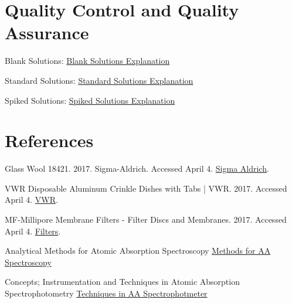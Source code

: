 \documentclass[12pt]{../SOP3_beta}\usepackage[]{graphicx}\usepackage[]{color}
\begin{document}
\section{Quality Control and Quality Assurance}

\NP Blank Solutions: \href{https://en.wikipedia.org/wiki/Blank_(solution)}{Blank Solutions Explanation}

\NP Standard Solutions: \href{https://en.wikipedia.org/wiki/Standard_solution}{Standard Solutions Explanation}

\NP Spiked Solutions: \href{}{Spiked Solutions Explanation}



\section{References}



\NP Glass Wool 18421. 2017. Sigma-Aldrich. Accessed April 4. \href{http://www.sigmaaldrich.com/catalog/product/sial/18421}{Sigma Aldrich}.

\NP VWR Disposable Aluminum Crinkle Dishes with Tabs | VWR. 2017. Accessed April 4. \href{https://us.vwr.com/store/catalog/product.jsp?product_id=4622693}{VWR}.

\NP MF-Millipore Membrane Filters - Filter Discs and Membranes. 2017. Accessed April 4. \href{https://www.emdmillipore.com/US/en/product/MF-Millipore%E2%84%A2-Membrane-Filters,MM_NF-C152}{Filters}.

\NP Analytical Methods for Atomic Absorption Spectroscopy \href{http://www1.lasalle.edu/~prushan/Intrumental%20Analysis_files/AA-Perkin%20Elmer%20guide%20to%20all!.pdf}{Methods for AA Spectroscopy}

\NP Concepts; Instrumentation and Techniques in Atomic Absorption Spectrophotometry \href{http://www.ufjf.br/baccan/files/2011/05/AAS-Perkin1.pdf}{Techniques in AA Spectrophotmeter}
\end{document}
